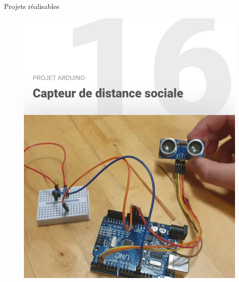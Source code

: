 \documentclass[]{beamer}
\begin{document}
	\begin{frame}
	{Projets réalisables}
			\begin{figure}
				\begin{center}
					\includegraphics[scale=0.4]{distance.png}
				\end{center}
			\end{figure}
	\end{frame}
\end{document}
